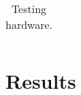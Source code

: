 \begin{table}
\footnotesize
\centering
\begin{tabular}{| L{1.2cm} | L{6.2cm} | L{1.5cm} | L{1.5cm} | L{1.5cm} | L{1.5cm} | L{1.5cm} |}
\hline

\hline
\end{tabular}
\caption{%
  Testing hardware. %
}
\label{tab:hw}
\end{table}

\section{Results}


\clearpage
\begin{appendices}
\end{appendices}


